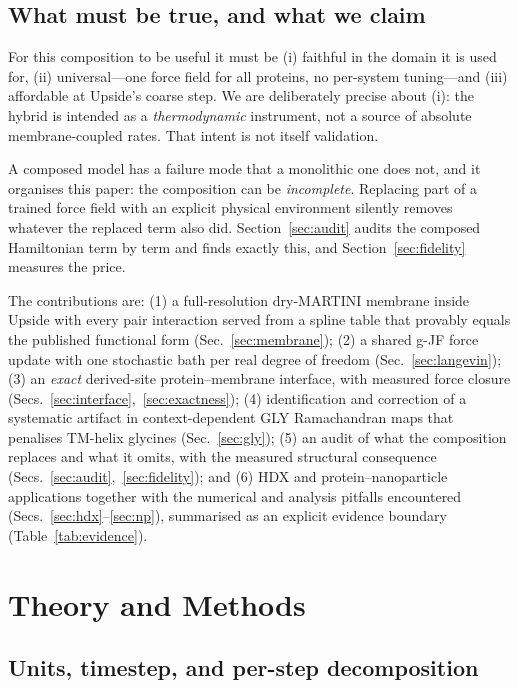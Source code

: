 \documentclass[journal=jctcce,manuscript=article,layout=twocolumn]{achemso}
\begin{document}
\subsection{What must be true, and what we claim}

For this composition to be useful it must be (i) faithful in the domain it is used
for, (ii) universal---one force field for all proteins, no per-system tuning---and
(iii) affordable at Upside's coarse step. We are deliberately precise about (i): the
hybrid is intended as a \emph{thermodynamic} instrument, not a source of absolute
membrane-coupled rates. That intent is not itself validation.

A composed model has a failure mode that a monolithic one does not, and it organises
this paper: the composition can be \emph{incomplete}. Replacing part of a trained
force field with an explicit physical environment silently removes whatever the
replaced term also did. Section~\ref{sec:audit} audits the composed Hamiltonian term
by term and finds exactly this, and Section~\ref{sec:fidelity} measures the price.

The contributions are: (1) a full-resolution dry-MARTINI membrane inside Upside with
every pair interaction served from a spline table that provably equals the published
functional form (Sec.~\ref{sec:membrane}); (2) a shared g-JF force update with one
stochastic bath per real degree of freedom (Sec.~\ref{sec:langevin}); (3) an
\emph{exact} derived-site protein--membrane interface, with measured force closure
(Secs.~\ref{sec:interface},~\ref{sec:exactness}); (4) identification and correction
of a systematic artifact in context-dependent GLY Ramachandran maps that penalises
TM-helix glycines (Sec.~\ref{sec:gly}); (5) an audit of what the composition
replaces and what it omits, with the measured structural consequence
(Secs.~\ref{sec:audit},~\ref{sec:fidelity}); and (6) HDX and protein--nanoparticle
applications together with the numerical and analysis pitfalls encountered
(Secs.~\ref{sec:hdx}--\ref{sec:np}), summarised as an explicit evidence boundary
(Table~\ref{tab:evidence}).

\section{Theory and Methods}

\subsection{Units, timestep, and per-step decomposition}
\label{sec:units}
\end{document}
